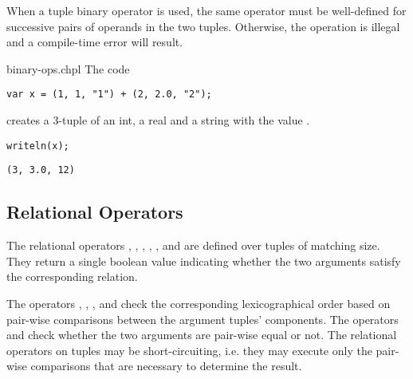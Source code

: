 When a tuple binary operator is used, the same operator must be
well-defined for successive pairs of operands in the two tuples.
Otherwise, the operation is illegal and a compile-time error will
result.

\begin{chapelexample}{binary-ops.chpl}
The code
\begin{chapel}
\begin{verbatim}
var x = (1, 1, "1") + (2, 2.0, "2");
\end{verbatim}
\end{chapel}
creates a 3-tuple of an int, a real and a string with the value .
\begin{chapelpost}
\begin{verbatim}
writeln(x);
\end{verbatim}
\end{chapelpost}
\begin{chapeloutput}
\begin{verbatim}
(3, 3.0, 12)
\end{verbatim}
\end{chapeloutput}
\end{chapelexample}


\subsection{Relational Operators}
\label{Tuple_Relational_Operators}


The relational operators \chpl{>}, \chpl{>=}, \chpl{<}, \chpl{<=},
\chpl{==}, and \chpl{!=} are defined over tuples of matching size.
They return a single boolean value indicating whether the two
arguments satisfy the corresponding relation.

The operators \chpl{>}, \chpl{>=}, \chpl{<}, and \chpl{<=}
check the corresponding lexicographical order
based on pair-wise comparisons between the argument tuples' components.
The operators \chpl{==} and \chpl{!=} check whether
the two arguments are pair-wise equal or not.
The relational operators on tuples may be short-circuiting, i.e.
they may execute only the pair-wise comparisons that are necessary
to determine the result.

